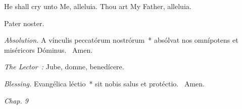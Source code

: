 {

  {
    \def\preant{\setgrefactor{17}\large}
    \def\prepsalm{\normalsize}
    \def\anttranslation{He shall cry unto Me, alleluia, Thou art My Father, alleluia.}
  }

  {
    \def\preant{\setgrefactor{17}\large}
    \def\prepsalm{\normalsize}
    \def\anttranslation{Let the heavens rejoice, and let the earth be glad before the Lord, for He cometh.}
  }

  {
    \def\preant{\setgrefactor{17}\large}
    \def\prepsalm{\normalsize}
    \def\anttranslation{The Lord hath made known, alleluia, His salvation, alleluia.}
  }

  \bigskip
  {
    {He shall cry unto Me, alleluia.}
    {Thou art My Father, alleluia.}
  }

  {
    {Pater noster.}

    \emph{Absolution.} A vínculis peccatórum nostrórum~* absólvat nos omnípotens et miséricors Dóminus. \Rbar{}~Amen.

    \emph{The Lector~:} Jube, domne, benedícere.

    \emph{Blessing.} Evangélica léctio~* sit nobis salus et protéctio. \Rbar{}~Amen.
  }

  \bigskip{}
  {


  }

  {
    \hspace{10ex}{Lesson VII.}\hfill\emph{Chap. 9}\hspace{10ex}

    \begin{parcolumns}[rulebetween,colwidths={1=.51\linewidth}]{2}
\end{parcolumns}}}
